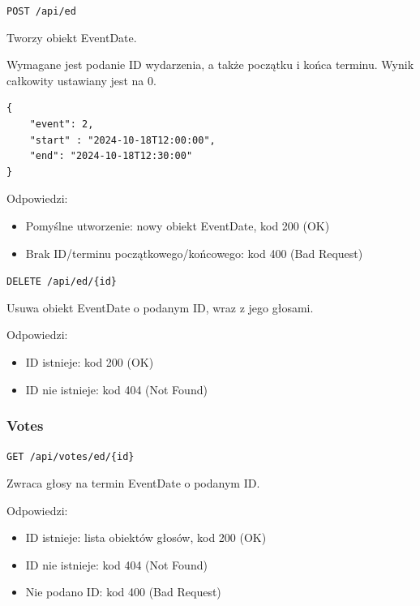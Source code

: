\documentclass[a4paper,twoside,12pt]{book}
\begin{document}
\label{create-eventdate}

\texttt{POST\ /api/ed}

Tworzy obiekt EventDate.

Wymagane jest podanie ID wydarzenia, a także początku i końca terminu. Wynik całkowity ustawiany jest na 0.

\begin{verbatim}
{
    "event": 2,
    "start" : "2024-10-18T12:00:00",
    "end": "2024-10-18T12:30:00"
}
\end{verbatim}

Odpowiedzi: 
\begin{itemize}
	\item Pomyślne utworzenie: nowy obiekt EventDate, kod 200 (OK) 
	\item Brak ID/terminu początkowego/końcowego: kod 400 (Bad Request)
\end{itemize}

\label{delete-eventdate}

\texttt{DELETE\ /api/ed/\{id\}}

Usuwa obiekt EventDate o podanym ID, wraz z jego głosami.

Odpowiedzi: 
\begin{itemize}
	\item ID istnieje: kod 200 (OK) 
	\item ID nie istnieje: kod 404 (Not Found)
\end{itemize}

\subsubsection{Votes}\label{votes}

\label{get-votes-by-eventdate-id}

\texttt{GET\ /api/votes/ed/\{id\}}

Zwraca głosy na termin EventDate o podanym ID.

Odpowiedzi: 
\begin{itemize}
	\item ID istnieje: lista obiektów głosów, kod 200 (OK) 
	\item ID nie istnieje: kod 404 (Not Found) 
	\item Nie podano ID: kod 400 (Bad Request)
\end{itemize}

\label{get-current-users-vote-by-eventdate-id}
\end{document}
